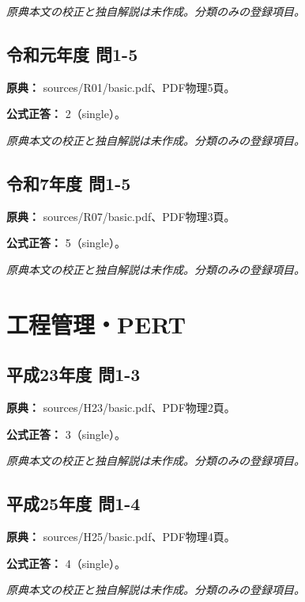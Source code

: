 \par\textit{原典本文の校正と独自解説は未作成。分類のみの登録項目。}

\subsection{令和元年度 問1-5}
\label{q:r01-reg-basic-1-5}

\noindent\textbf{原典：} sources/R01/basic.pdf、PDF物理5頁。

\textbf{公式正答：} 2（single）。

\par\textit{原典本文の校正と独自解説は未作成。分類のみの登録項目。}

\subsection{令和7年度 問1-5}
\label{q:r07-reg-basic-1-5}

\noindent\textbf{原典：} sources/R07/basic.pdf、PDF物理3頁。

\textbf{公式正答：} 5（single）。

\par\textit{原典本文の校正と独自解説は未作成。分類のみの登録項目。}

\section{工程管理・PERT}

\subsection{平成23年度 問1-3}
\label{q:h23-reg-basic-1-3}

\noindent\textbf{原典：} sources/H23/basic.pdf、PDF物理2頁。

\textbf{公式正答：} 3（single）。

\par\textit{原典本文の校正と独自解説は未作成。分類のみの登録項目。}

\subsection{平成25年度 問1-4}
\label{q:h25-reg-basic-1-4}

\noindent\textbf{原典：} sources/H25/basic.pdf、PDF物理4頁。

\textbf{公式正答：} 4（single）。

\par\textit{原典本文の校正と独自解説は未作成。分類のみの登録項目。}

